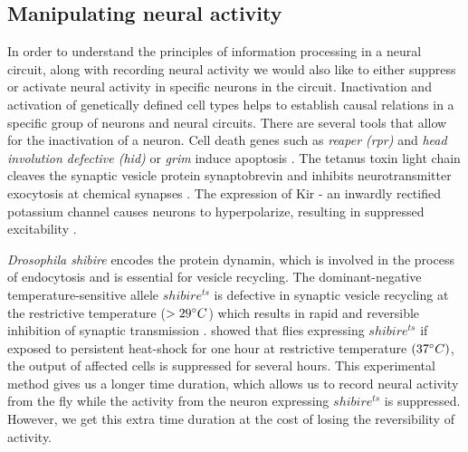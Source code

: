 \subsection{Manipulating neural activity}

In order to understand the principles of information processing in a neural circuit, along with recording neural activity we would also like to either suppress or activate neural activity in specific neurons in the circuit. Inactivation and activation of genetically defined cell types helps to establish causal relations in a specific group of neurons and neural circuits. There are several tools that allow for the inactivation of a neuron. Cell death genes such as \textit{reaper (rpr)} and \textit{head involution defective (hid)} or \textit{grim} induce apoptosis \parencite{Chen1996, Grether1995}.  The tetanus toxin light chain cleaves the synaptic vesicle protein synaptobrevin and inhibits neurotransmitter exocytosis at chemical synapses \parencite{Sweeney1995}. The expression of Kir - an inwardly rectified potassium channel causes neurons to hyperpolarize, resulting in suppressed excitability \parencite{Johns1999}. %

\textit{Drosophila shibire} encodes the protein dynamin, which is involved in the process of endocytosis and is essential for vesicle recycling. The dominant-negative temperature-sensitive allele $shibire^{ts}$ is defective in synaptic vesicle recycling at the restrictive temperature ($>29\degree C$) which results in rapid and reversible inhibition of synaptic transmission \parencite{Kitamoto2001}. \cite{Joesch2010} showed that flies expressing $shibire^{ts}$ if exposed to persistent heat-shock for one hour at restrictive temperature $(37\degree C)$, the output of affected cells is suppressed for several hours. This experimental method gives us a longer time duration, which allows us to record neural activity from the fly while the activity from the neuron expressing $shibire^{ts}$ is suppressed. However, we get this extra time duration at the cost of losing the reversibility of activity.

